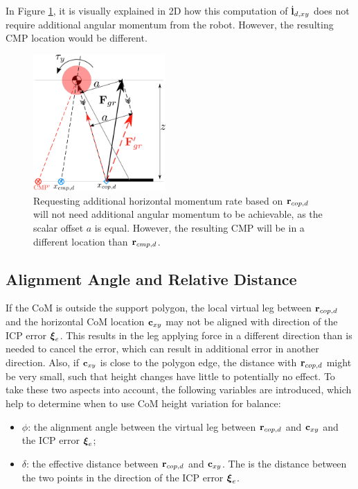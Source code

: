 In Figure \ref{fig:rcopdvsrcmpd}, it is visually explained in \ac{2D} how this computation of $\dot{\mathbf{l}}_{d,xy}$ does not require additional angular momentum from the robot. However, the resulting \ac{CMP} location would be different.

\begin{figure}
\centering
\includegraphics[width=0.45\textwidth]{STYLESTUFF/2DControlStrategyViz.png}
\caption{Requesting additional horizontal momentum rate based on $\mathbf{r}_{cop,d}$ will not need additional angular momentum to be achievable, as the scalar offset $a$ is equal. However, the resulting \ac{CMP} will be in a different location than $\mathbf{r}_{cmp,d}$.}
\label{fig:rcopdvsrcmpd}
\end{figure}
\subsection{Alignment Angle and Relative Distance}
If the \ac{CoM} is outside the support polygon, the local virtual leg between $\mathbf{r}_{cop,d}$ and the horizontal \ac{CoM} location $\mathbf{c}_{xy}$ may not be aligned with direction of the \ac{ICP} error $\boldsymbol{\xi}_e$. This results in the leg applying force in a different direction than is needed to cancel the error, which can result in additional error in another direction. Also, if $\mathbf{c}_{xy}$ is close to the polygon edge, the distance with $\mathbf{r}_{cop,d}$ might be very small, such that height changes have little to potentially no effect. To take these two aspects into account, the following variables are introduced, which help to determine when to use \ac{CoM} height variation for balance:
\begin{itemize}
	\item $\phi$: the alignment angle between the virtual leg between $\mathbf{r}_{cop,d}$ and $\mathbf{c}_{xy}$ and the \ac{ICP} error $\boldsymbol{\xi}_e$;
	\item $\delta$: the effective distance between $\mathbf{r}_{cop,d}$ and $\mathbf{c}_{xy}$. The is the distance between the two points in the direction of the \ac{ICP} error $\boldsymbol{\xi}_e$.
\end{itemize}

